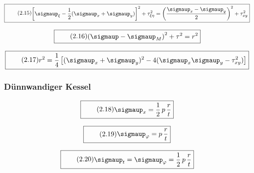 \documentclass[11pt]{article}
\newcommand{\1}{ {\mathds{1}} }
\renewcommand{\sigma  }{\sigmaup   }
\begin{document}
		\begin{equation}
			\boxed{
				\tag{2.15}
				\begin{split}
					\left[\sigma_\xi - \frac{1}{2} (\sigma_x + \sigma_y)\right]^2
					+
					\tau_{\xi \eta}^2
					=
					\left(
						\frac{\sigma_x - \sigma_y}{2}
					\right)^2
					+
					\tau_{xy}^2
				\end{split}
			}
		\end{equation}		

		\begin{equation}
			\boxed{
				\tag{2.16}
				\begin{split}
					\left(\sigma - \sigma_M\right)^2
					+
					\tau^2
					=
					r^2
				\end{split}
			}
		\end{equation}		

		\begin{equation}
			\boxed{
				\tag{2.17}
				\begin{split}
					r^2
					=
					\frac{1}{4}
					\left[
						(\sigma_x + \sigma_y)^2
						-
						4 (\sigma_x\sigma_y -\tau_{xy}^2)
					\right]
				\end{split}
			}
		\end{equation}		

		\subsubsection{Dünnwandiger Kessel}

		\begin{equation}
			\boxed{
				\tag{2.18}
				\begin{split}
					\sigma_x
					=
					\frac{1}{2} \,p\, \frac{r}{t}
				\end{split}
			}
		\end{equation}

		\begin{equation}
			\boxed{
				\tag{2.19}
				\begin{split}
					\sigma_{\varphi}
					=
					p\,
					\frac{r}{t}
				\end{split}
			}
		\end{equation}

		\begin{equation}
			\boxed{
				\tag{2.20}
				\begin{split}
					\sigma_t
					=
					\sigma_\varphi
					=
					\frac{1}{2}\,p\,\frac{r}{t}
				\end{split}
			}
		\end{equation}
\end{document}
